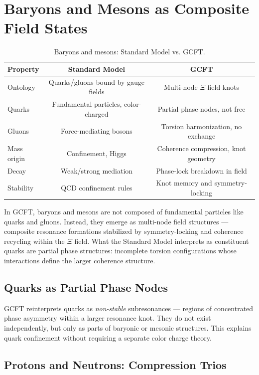 \section{Baryons and Mesons as Composite Field States}

\begin{table}[ht]
\centering
\begin{tabular}{lcc}
\hline
\textbf{Property} & \textbf{Standard Model} & \textbf{GCFT} \\
\hline
Ontology         & Quarks/gluons bound by gauge fields & Multi-node $\Xi$-field knots \\
Quarks           & Fundamental particles, color-charged & Partial phase nodes, not free \\
Gluons           & Force-mediating bosons  & Torsion harmonization, no exchange \\
Mass origin      & Confinement, Higgs      & Coherence compression, knot geometry \\
Decay            & Weak/strong mediation   & Phase-lock breakdown in field \\
Stability        & QCD confinement rules   & Knot memory and symmetry-locking \\
\hline
\end{tabular}
\caption{Baryons and mesons: Standard Model vs. GCFT.}
\label{tab:baryon_gcft_compare}
\end{table}

In GCFT, baryons and mesons are not composed of fundamental particles like quarks and gluons. Instead, they emerge as multi-node field structures — composite resonance formations stabilized by symmetry-locking and coherence recycling within the $\Xi$ field. What the Standard Model interprets as constituent quarks are partial phase structures: incomplete torsion configurations whose interactions define the larger coherence structure.

\subsection{Quarks as Partial Phase Nodes}

GCFT reinterprets quarks as \emph{non-stable} subresonances — regions of concentrated phase asymmetry within a larger resonance knot. They do not exist independently, but only as parts of baryonic or mesonic structures. This explains quark confinement without requiring a separate color charge theory.

\subsection{Protons and Neutrons: Compression Trios}

